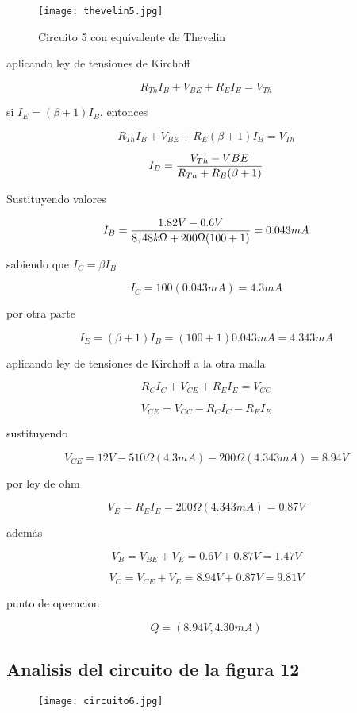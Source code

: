 \documentclass[10pt, a4paper]{article}
\begin{document}
    \begin{figure}[h!]
        \centering
        \texttt{[image: thevelin5.jpg]} \par
        \caption{\label{fig:13} Circuito 5 con equivalente de Thevelin}
    \end{figure}

    aplicando ley de tensiones de Kirchoff

    $$R_{Th}I_B + V_{BE} + R_EI_E = V_{Th}$$

    si $I_E = (\beta + 1)I_B$, entonces

    $$R_{Th}I_B + V_{BE} + R_E(\beta + 1)I_B = V_{Th}$$

    $$I_B = {V_{Th} - V{BE} \over R_{Th} + R_E(\beta + 1)}$$

    Sustituyendo valores

    $$I_B = {1.82V - 0.6V \over 8,48k\Omega + 200\Omega(100 + 1)} = 0.043mA$$

    sabiendo que $I_C = \beta I_B$

    $$I_C = 100(0.043mA) = 4.3mA$$

    por otra parte

    $$I_E = (\beta + 1)I_B = (100 + 1)0.043mA = 4.343mA$$

    aplicando ley de tensiones de Kirchoff a la otra malla

    $$R_{C}I_C + V_{CE} + R_EI_E = V_{CC}$$

    $$V_{CE} = V_{CC} - R_{C}I_C - R_EI_E$$

    sustituyendo

    $$V_{CE} = 12V - 510\Omega (4.3mA) - 200\Omega (4.343mA) = 8.94V$$

    por ley de ohm

    $$V_E = R_EI_E = 200\Omega (4.343mA) = 0.87V$$

    además

    $$V_B = V_{BE} + V_E = 0.6V + 0.87V = 1.47V$$

    $$V_C = V_{CE} + V_E = 8.94V + 0.87V = 9.81V$$

    punto de operacion

    $$Q = (8.94V, 4.30mA)$$

    \subsection{Analisis del circuito de la figura 12}

    \begin{figure}[h!]
        \centering
        \texttt{[image: circuito6.jpg]}
    \end{figure}
\end{document}
